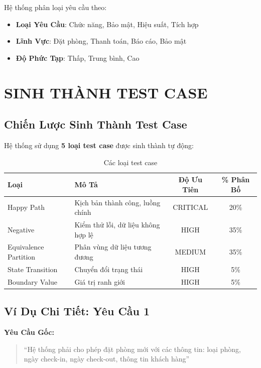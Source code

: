 \documentclass[12pt, a4paper]{article}
\begin{document}
Hệ thống phân loại yêu cầu theo:
\begin{itemize}
    \item \textbf{Loại Yêu Cầu}: Chức năng, Bảo mật, Hiệu suất, Tích hợp
    \item \textbf{Lĩnh Vực}: Đặt phòng, Thanh toán, Báo cáo, Bảo mật
    \item \textbf{Độ Phức Tạp}: Thấp, Trung bình, Cao
\end{itemize}

\newpage

\section{SINH THÀNH TEST CASE}

\subsection{Chiến Lược Sinh Thành Test Case}

Hệ thống sử dụng \textbf{5 loại test case} được sinh thành tự động:

\begin{table}[h]
\centering
\renewcommand{\arraystretch}{1.8}
\begin{tabular}{|l|p{5cm}|c|c|}
\hline
\textbf{Loại} & \textbf{Mô Tả} & \textbf{Độ Ưu Tiên} & \textbf{\% Phân Bố} \\
\hline
Happy Path & Kịch bản thành công, luồng chính & CRITICAL & 20\% \\
Negative & Kiểm thử lỗi, dữ liệu không hợp lệ & HIGH & 35\% \\
Equivalence Partition & Phân vùng dữ liệu tương đương & MEDIUM & 35\% \\
State Transition & Chuyển đổi trạng thái & HIGH & 5\% \\
Boundary Value & Giá trị ranh giới & HIGH & 5\% \\
\hline
\end{tabular}
\caption{Các loại test case}
\end{table}

\subsection{Ví Dụ Chi Tiết: Yêu Cầu 1}

\textbf{Yêu Cầu Gốc:}
\begin{quote}
``Hệ thống phải cho phép đặt phòng mới với các thông tin: loại phòng, ngày check-in, ngày check-out, thông tin khách hàng''
\end{quote}
\end{document}
